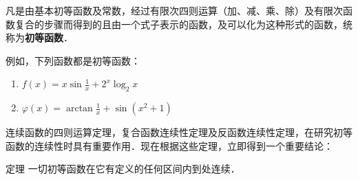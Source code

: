 凡是由基本初等函数及常数，经过有限次四则运算（加、减、乘、除）及有限次函数复合的步骤而得到的且由一个式子表示的函数，及可以化为这种形式的函数，统称为\textbf{初等函数}．

例如，下列函数都是初等函数：
\begin{enumerate}
    \item $f(x)=x\sin\frac{1}{x}+2^x\log_2 x$
    \item $\varphi(x)=\arctan\frac{1}{x}+\sin(x^2+1)$
\end{enumerate}

连续函数的四则运算定理，复合函数连续性定理及反函数连续性定理，在研究初等函数的连续性时具有重要作用．现在根据这些定理，立即得到一个重要结论：

\begin{blk}
 {定理} 一切初等函数在它有定义的任何区间内到处连续．
\end{blk}

